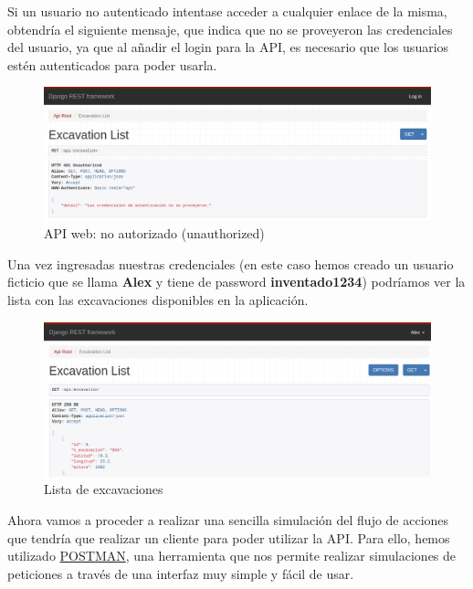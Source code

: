 Si un usuario no autenticado intentase acceder a cualquier enlace de la misma, obtendría el
siguiente mensaje, que indica que no se proveyeron las credenciales del usuario, ya que al
añadir el login para la API, es necesario que los usuarios estén autenticados para poder
usarla.

        \begin{figure}[H]
            \centering
            \includegraphics[scale=0.30]{imagenes/unauthorized.png}
            \caption{API web: no autorizado (unauthorized)}
            \label{fig:unauthorized}
        \end{figure}

Una vez ingresadas nuestras credenciales (en este caso hemos creado un usuario ficticio que
se llama \textbf{Alex} y tiene de password \textbf{inventado1234}) podríamos ver la lista
con las excavaciones disponibles en la aplicación.

        \begin{figure}[H]
            \centering
            \includegraphics[scale=0.30]{imagenes/list-excavations.png}
            \caption{Lista de excavaciones}
            \label{fig:list-excavations}
        \end{figure}

Ahora vamos a proceder a realizar una sencilla simulación del flujo de acciones que tendría
que realizar un cliente para poder utilizar la API. Para ello, hemos utilizado
\href{https://www.postman.com/}{POSTMAN}, una herramienta que nos permite realizar
simulaciones de peticiones a través de una interfaz muy simple y fácil de usar.\\

